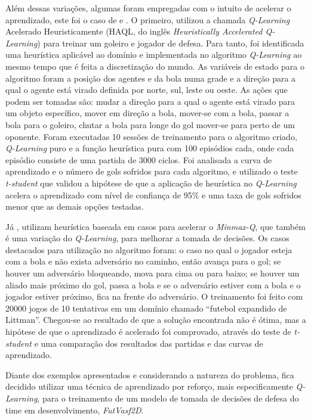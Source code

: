 Além dessas variações, algumas foram empregadas com o intuito de acelerar o aprendizado, este foi o
caso de  e . O primeiro, utilizou a chamada \textit{Q-Learning} Acelerado Heuristicamente (HAQL, do inglês
\textit{Heuristically Accelerated Q-Learning}) para treinar um goleiro e jogador de defesa. Para
tanto, foi identificada uma heurística aplicável ao domínio e implementada no algoritmo
\textit{Q-Learning} ao mesmo tempo que é feita a discretização do mundo. As variáveis de estado para
o algoritmo foram a posição dos agentes e da bola numa grade e a direção para a qual o agente está
virado definida por norte, sul, leste ou oeste. As ações que podem ser tomadas são: mudar a direção
para a qual o agente está virado para um objeto específico, mover em direção a bola, mover-se com a
bola, passar a bola para o goleiro, chutar a bola para longe do gol mover-se para perto de um
oponente. Foram executadas 10 sessões de treinamento para o algoritmo criado, \textit{Q-Learning}
puro e a função heurística pura com 100 episódios cada, onde cada episódio consiste de uma partida
de 3000 ciclos. Foi analisada a curva de aprendizado e o número de gols sofridos para cada
algoritmo, e utilizado o teste \textit{t-student} que validou a hipótese de que a aplicação de
heurística no \textit{Q-Learning} acelera o aprendizado com nível de confiança de 95\% e uma taxa de
gols sofridos menor que as demais opções testadas.

Já , utilizam heurística baseada em casos para acelerar o
\textit{Minmax-Q}, que também é uma variação do \textit{Q-Learning}, para melhorar a tomada de
decisões. Os casos destacados para utilização no algoritmo foram: o caso no qual o jogador esteja com a
bola e não exista adversário no caminho, então avança para o gol; se houver um adversário bloqueando, mova
para cima ou para baixo; se houver um aliado mais próximo do gol, passa a bola e se o adversário
estiver com a bola e o jogador estiver próximo, fica na frente do adversário. O treinamento foi
feito com 20000 jogos de 10 tentativas em um domínio chamado ``futebol expandido de Littman''.
Chegou-se ao resultado de que a solução encontrada não é ótima, mas a hipótese de que o aprendizado
é acelerado foi comprovado, através do teste de \textit{t-student} e uma comparação dos resultados
das partidas e das curvas de aprendizado.

Diante dos exemplos apresentados e considerando a natureza do problema, fica decidido utilizar uma
técnica de aprendizado por reforço, mais especificamente \textit{Q-Learning}, para o treinamento de
um modelo de tomada de decisões de defesa do time em desenvolvimento, \textit{FutVasf2D}.

